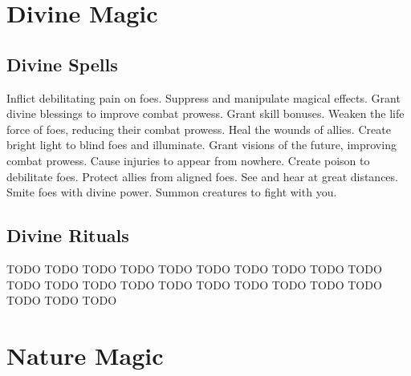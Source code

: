 \section{Divine Magic}\label{Divine Magic}
\subsection{Divine Spells}\label{Divine Spells}
\begin{spelllist}
 Inflict debilitating pain on foes.
 Suppress and manipulate magical effects.
 Grant divine blessings to improve combat prowess.
 Grant skill bonuses.
 Weaken the life force of foes, reducing their combat prowess.
 Heal the wounds of allies.
 Create bright light to blind foes and illuminate.
 Grant visions of the future, improving combat prowess.
 Cause injuries to appear from nowhere.
 Create poison to debilitate foes.
 Protect allies from aligned foes.
 See and hear at great distances.
 Smite foes with divine power.
 Summon creatures to fight with you.
\end{spelllist}
\subsection{Divine Rituals}\label{Divine Rituals}
\begin{spelllist}
 TODO
 TODO
 TODO
 TODO
 TODO
 TODO
 TODO
 TODO
 TODO
 TODO
 TODO
 TODO
 TODO
 TODO
 TODO
 TODO
 TODO
 TODO
 TODO
 TODO
 TODO
 TODO
 TODO
\end{spelllist}
\small
\section{Nature Magic}\label{Nature Magic}
